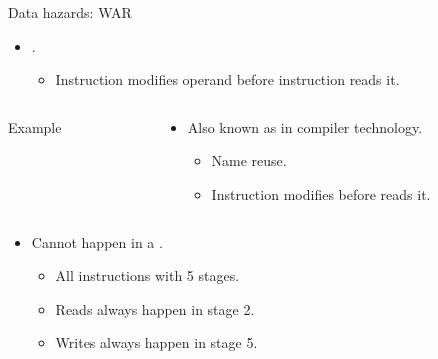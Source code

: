 \begin{frame}[t,fragile]{Data hazards: WAR}
\begin{itemize}
  \item {}.
    \begin{itemize}
      \item Instruction  modifies operand before 
            instruction  reads it.
    \end{itemize}
\end{itemize}
\begin{columns}
\begin{column}{.25\textwidth}
\begin{block}{Example}

\end{block}
\end{column}
\begin{column}{.75\textwidth}
\begin{itemize}
  \item Also known as  in compiler technology.
    \begin{itemize}
      \item Name reuse.
      \item Instruction  modifies 
            before  reads it.
    \end{itemize}
\end{itemize}
\end{column}
\end{columns}
\begin{itemize}
  \item \alert{Cannot} happen in a .
  \begin{itemize}
    \item All instructions with 5 stages.
    \item Reads always happen in stage 2.
    \item Writes always happen in stage 5.
  \end{itemize}
\end{itemize}
\end{frame}

